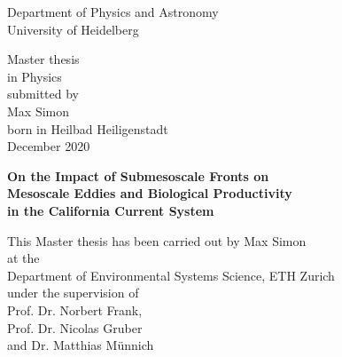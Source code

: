 
\thispagestyle{empty}
\begin{center}
  \doublespacing
  \Large\sffamily
  Department of Physics and Astronomy\\
  \large University of Heidelberg
  \par\vfill\normalfont
  Master thesis\\
  in Physics\\
  submitted by\\
  Max Simon\\
  born in Heilbad Heiligenstadt\\
  December 2020
\end{center}
\newpage

\thispagestyle{empty}
\begin{center}
  \doublespacing
  \Large\bfseries\sffamily
  On the Impact of Submesoscale Fronts on\\
  Mesoscale Eddies and Biological Productivity\\
  in the California Current System
  \par
  \vfill
  \large\normalfont
  This Master thesis has been carried out by Max Simon\\
  at the\\
  Department of Environmental Systems Science, ETH Zurich\\
  under the supervision of\\
  Prof. Dr. Norbert Frank,\\
  Prof. Dr. Nicolas Gruber\\
  and Dr. Matthias Münnich
\end{center}\par
